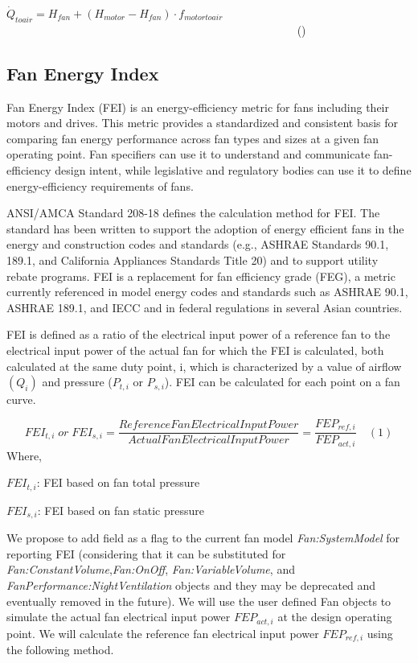 \({\dot Q_{toair}} = {H_{fan}} + \left( {{H_{motor}} - {H_{fan}}} \right) \cdot {f_{motortoair}}\) ~~~~~~~~~~~~~~~~~~~~~~~~~~~~~~~~~~~~~~~~~~~~~~~~~~~ ()

\subsection{Fan Energy Index}\label{fan-energy-index}

Fan Energy Index (FEI) is an energy-efficiency metric for fans including their motors and drives. This metric provides a standardized and consistent basis for comparing fan energy performance across fan types and sizes at a given fan operating point. Fan specifiers can use it to understand and communicate fan-efficiency design intent, while legislative and regulatory bodies can use it to define energy-efficiency requirements of fans.

ANSI/AMCA Standard 208-18 defines the calculation method for FEI. The standard has been written to support the adoption of energy efficient fans in the energy and construction codes and standards (e.g., ASHRAE Standards 90.1, 189.1, and California Appliances Standards Title 20) and to support utility rebate programs. FEI is a replacement for fan efficiency grade (FEG), a metric currently referenced in model energy codes and standards such as ASHRAE 90.1, ASHRAE 189.1, and IECC and in federal regulations in several Asian countries.

FEI is defined as a ratio of the electrical input power of a reference fan to the electrical input power of the actual fan for which the FEI is calculated, both calculated at the same duty point, i, which is characterized by a value of airflow \((Q_i)\) and pressure (\(P_{t,i}\) or \(P_{s,i}\)). FEI can be calculated for each point on a fan curve.

$$FEI_{t,i}\;or\;FEI_{s,i}=\frac{Reference Fan Electrical Input Power}{Actual Fan Electrical Input Power} = \frac{FEP_{ref,i}}{FEP_{act,i}} \quad (1) $$ 
Where,

\(FEI_{t,i}\): FEI based on fan total pressure

\(FEI_{s,i}\): FEI based on fan static pressure

We propose to add field as a flag to the current fan model \emph{Fan:SystemModel} for reporting FEI (considering that it can be substituted for \emph{Fan:ConstantVolume},\emph{Fan:OnOff}, \emph{Fan:VariableVolume}, and \emph{FanPerformance:NightVentilation} objects and they may be deprecated and eventually removed in the future). We will use the user defined Fan objects to simulate the actual fan electrical input power \(FEP_{act,i}\) at the design operating point. We will calculate the reference fan electrical input power \(FEP_{ref,i}\) using the following method.


